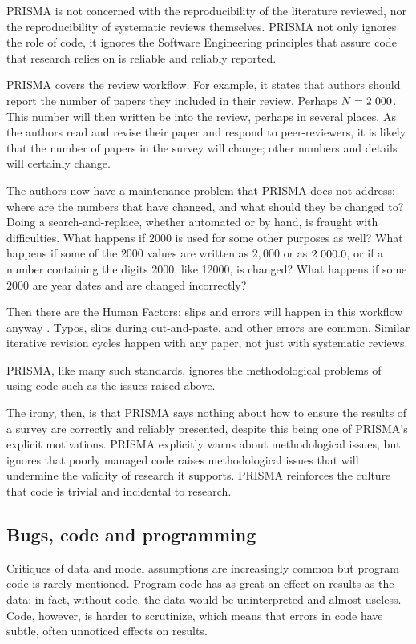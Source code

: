 \documentclass{comjnl}
\begin{document}
PRISMA is not concerned with the reproducibility of the literature reviewed, nor the reproducibility of systematic reviews themselves. PRISMA not only ignores the role of code, it ignores the Software Engineering principles that assure code that research relies on is reliable and reliably reported. 

PRISMA covers the review workflow. For example, it states that authors should report the number of papers they included in their review. Perhaps $N=2\hskip 0.3em 000$. This number will then written be into the review, perhaps in several places. As the authors read and revise their paper and respond to peer-reviewers, it is likely that the number of papers in the survey will change; other numbers and details will certainly change. 

The authors now have a maintenance problem that PRISMA does not address: where are the numbers that have changed, and what should they be changed to? Doing a search-and-replace, whether automated or by hand, is fraught with difficulties. What happens if $2000$ is used for some other purposes as well? What happens if some of the $2000$ values are written as $2,000$ or as $2\hskip 0.3em 000.0$, or if a number containing the digits 2000, like 12000, is changed? What happens if some $2000$ are year dates and are changed incorrectly? 

Then there are the Human Factors: slips and errors will happen in this workflow anyway \cite{engima}. Typos, slips during cut-and-paste, and other errors are common. Similar iterative revision cycles happen with any paper, not just with systematic reviews. 

PRISMA, like many such standards, ignores the methodological problems of using code such as the issues raised above. 

The irony, then, is that PRISMA says nothing about how to ensure the results of a survey are correctly and reliably presented, despite this being one of PRISMA's explicit motivations. PRISMA explicitly warns about methodological issues, but ignores that poorly managed code raises methodological issues that will undermine the validity of research it supports. PRISMA reinforces the culture that code is trivial and incidental to research.

\subsection{Bugs, code and programming}\label{knowledge}
Critiques of data and model assumptions are increasingly common \cite{critiques,diagnosis-reviews} but program code is rarely mentioned. Program code has as great an effect on results as the data; in fact, without code, the data would be uninterpreted and almost useless. Code, however, is harder to scrutinize, which means that errors in code have subtle, often unnoticed effects on results.
\end{document}
